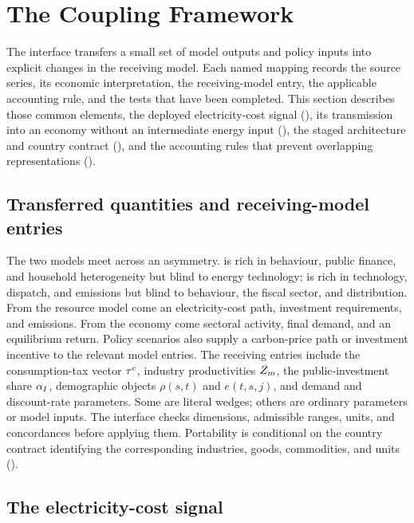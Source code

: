 \section{The Coupling Framework}
\label{sec:framework}

The interface transfers a small set of model outputs and policy inputs into explicit
changes in the receiving model. Each named mapping records the source series, its economic
interpretation, the receiving-model entry, the applicable accounting rule, and the tests
that have been completed. This section describes those common elements, the deployed
electricity-cost signal (), its transmission into an economy without an
intermediate energy input (), the staged architecture and country
contract (), and the accounting rules that prevent overlapping
representations ().

\subsection{Transferred quantities and receiving-model entries}
\label{sec:signals-wedges}

The two models meet across an asymmetry. \OGCore{} is rich in behaviour, public finance,
and household heterogeneity but blind to energy technology; \CLEWS{} is rich in
technology, dispatch, and emissions but blind to behaviour, the fiscal sector, and
distribution. From the resource model come an electricity-cost path, investment
requirements, and emissions. From the economy come sectoral activity, final demand, and
an equilibrium return. Policy scenarios also supply a carbon-price path or investment
incentive to the relevant model entries. The receiving entries include the
consumption-tax vector $\tau^{c}$, industry productivities $Z_m$, the public-investment
share $\alpha_{I}$, demographic objects $\rho(s,t)$ and $e(t,s,j)$, and \CLEWS{} demand and
discount-rate parameters. Some are literal wedges; others are ordinary parameters or
model inputs. The interface checks dimensions, admissible ranges, units, and
concordances before applying them. Portability is conditional on the country contract
identifying the corresponding industries, goods, commodities, and units
().

\subsection{The electricity-cost signal}
\label{sec:signal}

